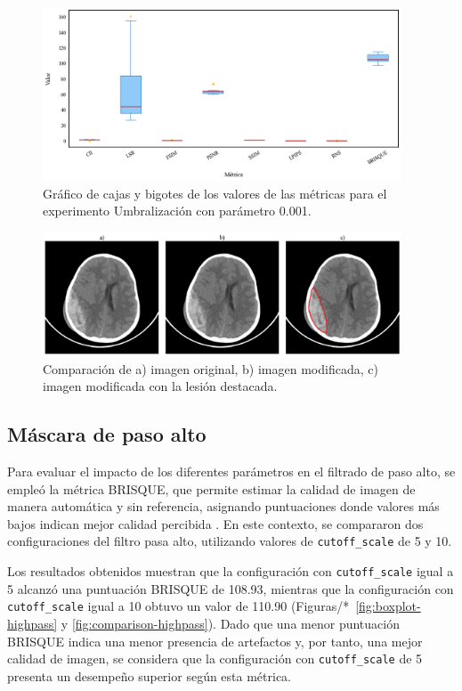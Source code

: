 \begin{figure}[H]
    \centering
    \includegraphics[width=0.95\textwidth]{Graphics/boxplot-threshold.png}
    \caption{Gráfico de cajas y bigotes de los valores de las métricas para el experimento Umbralización con parámetro 0.001.}
    \label{fig:boxplot-threshold}
\end{figure}

\begin{figure}[H]
    \centering
    \includegraphics[width=0.95\textwidth]{Graphics/comparison-thresholding.png}
    \caption{Comparación de a) imagen original, b) imagen modificada, c) imagen modificada con la lesión destacada.}
    \label{fig:comparison-thresholding}
\end{figure}

\subsection{Máscara de paso alto}

Para evaluar el impacto de los diferentes parámetros en el filtrado de paso alto, se empleó la métrica BRISQUE, que permite estimar la calidad de imagen de manera automática y sin referencia, asignando puntuaciones donde valores más bajos indican mejor calidad percibida \cite{BRISQUE}. En este contexto, se compararon dos configuraciones del filtro pasa alto, utilizando valores de \texttt{cutoff\_scale} de 5 y 10.

Los resultados obtenidos muestran que la configuración con \texttt{cutoff\_scale} igual a 5 alcanzó una puntuación BRISQUE de 108.93, mientras que la configuración con \texttt{cutoff\_scale} igual a 10 obtuvo un valor de 110.90 (Figuras/*~\ref{fig:boxplot-highpass} y \ref{fig:comparison-highpass}). Dado que una menor puntuación BRISQUE indica una menor presencia de artefactos y, por tanto, una mejor calidad de imagen, se considera que la configuración con \texttt{cutoff\_scale} de 5 presenta un desempeño superior según esta métrica.

